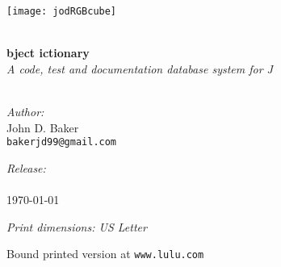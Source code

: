 \begin{titlepage}
 
\begin{center}
 
 
\texttt{[image: jodRGBcube]} 
 
\HRule \\[0.8cm]

{ \Huge \bfseries {} bject ictionary}\\[0.4cm]

\textsl{A code, test and documentation database system for J}\\[0.4cm]
 
\HRule \\[0.8cm]
 
 
\begin{minipage}{0.4\textwidth}
\begin{flushleft}
\emph{Author:}\\
John D. Baker \\
\texttt{bakerjd99@gmail.com} \\
\end{flushleft}
\end{minipage}
\begin{minipage}{0.4\textwidth}
\begin{flushright}
\emph{Release:}\\
\jodversion \\
\today \\
\end{flushright}
\end{minipage}

\vspace{0.8cm}

\emph{Print dimensions: US Letter}

Bound printed version at \texttt{www.lulu.com}



\end{center}
\end{titlepage}
